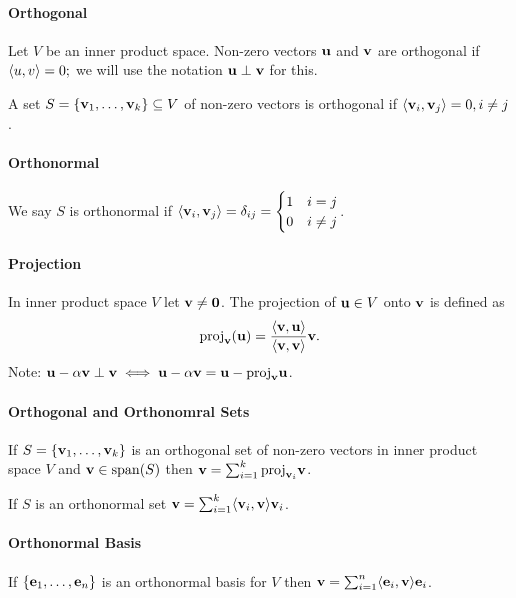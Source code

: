 \paragraph{Orthogonal}
Let \(V\) be an inner product space. Non-zero vectors \(\mathbf{u}\) and \(\mathbf{v}\) are orthogonal if \(\langle u, v \rangle = 0;\) we will use the notation \(\mathbf{u} \perp \mathbf{v}\) for this.

A set \(S = \{\mathbf{v}_1, \dots, \mathbf{v}_k\} \subseteq V\) of non-zero vectors is orthogonal if \(\langle \mathbf{v}_i, \mathbf{v}_j \rangle = 0, i \neq j\).

\paragraph{Orthonormal}
We say \(S\) is orthonormal if \(\langle \mathbf{v}_i, \mathbf{v}_j \rangle = \delta_{ij} = \begin{cases}
    1 & i = j \\
    0 & i \neq j
\end{cases}\).

\paragraph{Projection}
In inner product space \(V\) let \(\mathbf{v} \neq \mathbf{0}\). The projection of \(\mathbf{u} \in V\) onto \(\mathbf{v}\) is defined as
\[\mathrm{proj}_{\mathbf{v}}(\mathbf{u}) = \frac{\langle \mathbf{v}, \mathbf{u} \rangle}{\langle \mathbf{v}, \mathbf{v} \rangle}\mathbf{v}.\]
Note: \(\mathbf{u} - \alpha\mathbf{v} \perp \mathbf{v} \iff \mathbf{u} - \alpha\mathbf{v} = \mathbf{u} - \mathrm{proj}_{\mathbf{v}}\mathbf{u}\).

\paragraph{Orthogonal and Orthonomral Sets}
If \(S = \{\mathbf{v}_1, \dots, \mathbf{v}_k\}\) is an orthogonal set of non-zero vectors in inner product space \(V\) and \(\mathbf{v} \in \mathrm{span}(S)\) then \(\mathbf{v} = \sum_{i=1}^k \mathrm{proj}_{\mathbf{v}_i}\mathbf{v}\).

If \(S\) is an orthonormal set \(\mathbf{v} = \sum_{i=1}^k \langle \mathbf{v}_i, \mathbf{v} \rangle\mathbf{v}_i\).

\paragraph{Orthonormal Basis}
If \(\{\mathbf{e}_1, \dots, \mathbf{e}_n\}\) is an orthonormal basis for \(V\) then \(\mathbf{v} = \sum_{i=1}^n \langle \mathbf{e}_i, \mathbf{v} \rangle\mathbf{e}_i\).